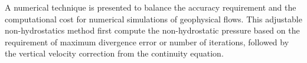 A numerical technique is presented to balance the accuracy requirement and the computational cost for numerical simulations of geophysical flows. This adjustable non-hydrostatics method first compute the non-hydrostatic pressure based on the requirement of maximum divergence error or number of iterations, followed by the vertical velocity correction from the continuity equation. 